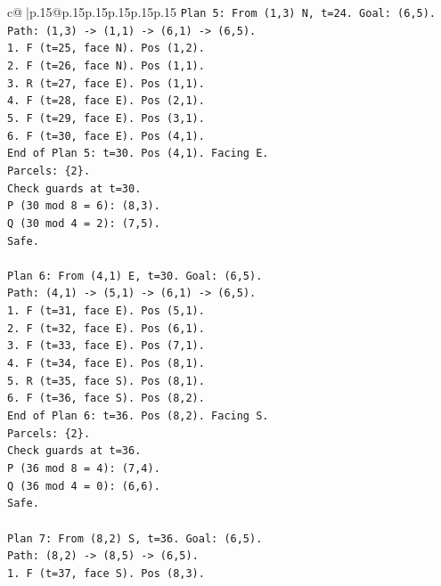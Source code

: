 \documentclass{article}
\begin{document}
{\begin{supertabular}{c@{$\;$}|p{.15\linewidth}@{}p{.15\linewidth}p{.15\linewidth}p{.15\linewidth}p{.15\linewidth}p{.15\linewidth}}
{{{\texttt{Plan 5: From (1,3) N, t=24. Goal: (6,5).} \\
\texttt{Path: (1,3) {-}> (1,1) {-}> (6,1) {-}> (6,5).} \\
\texttt{1. F (t=25, face N). Pos (1,2).} \\
\texttt{2. F (t=26, face N). Pos (1,1).} \\
\texttt{3. R (t=27, face E). Pos (1,1).} \\
\texttt{4. F (t=28, face E). Pos (2,1).} \\
\texttt{5. F (t=29, face E). Pos (3,1).} \\
\texttt{6. F (t=30, face E). Pos (4,1).} \\
\texttt{End of Plan 5: t=30. Pos (4,1). Facing E.} \\
\texttt{Parcels: \{2\}.} \\
\texttt{Check guards at t=30.} \\
\texttt{P (30 mod 8 = 6): (8,3).} \\
\texttt{Q (30 mod 4 = 2): (7,5).} \\
\texttt{Safe.} \\
\\ 
\texttt{Plan 6: From (4,1) E, t=30. Goal: (6,5).} \\
\texttt{Path: (4,1) {-}> (5,1) {-}> (6,1) {-}> (6,5).} \\
\texttt{1. F (t=31, face E). Pos (5,1).} \\
\texttt{2. F (t=32, face E). Pos (6,1).} \\
\texttt{3. F (t=33, face E). Pos (7,1).} \\
\texttt{4. F (t=34, face E). Pos (8,1).} \\
\texttt{5. R (t=35, face S). Pos (8,1).} \\
\texttt{6. F (t=36, face S). Pos (8,2).} \\
\texttt{End of Plan 6: t=36. Pos (8,2). Facing S.} \\
\texttt{Parcels: \{2\}.} \\
\texttt{Check guards at t=36.} \\
\texttt{P (36 mod 8 = 4): (7,4).} \\
\texttt{Q (36 mod 4 = 0): (6,6).} \\
\texttt{Safe.} \\
\\ 
\texttt{Plan 7: From (8,2) S, t=36. Goal: (6,5).} \\
\texttt{Path: (8,2) {-}> (8,5) {-}> (6,5).} \\
\texttt{1. F (t=37, face S). Pos (8,3).} \\
}}}
\end{supertabular}}
\end{document}
